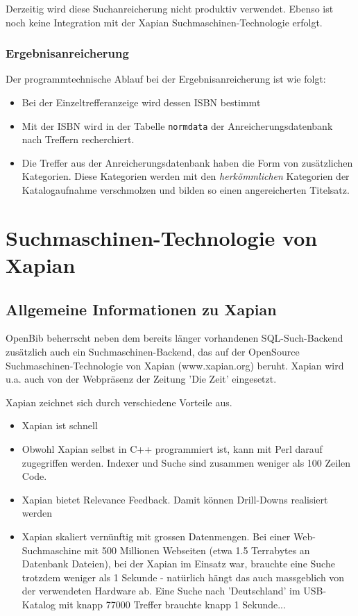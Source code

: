 \documentclass[11pt, twoside, a4paper, BCOR8mm, DIV12, bibtotoc,idxtotoc]{scrbook}
\begin{document}
Derzeitig wird diese Suchanreicherung nicht produktiv
verwendet. Ebenso ist noch keine Integration mit der Xapian
Suchmaschinen-Technologie erfolgt.

\subsubsection{Ergebnisanreicherung}
Der programmtechnische Ablauf bei der Ergebnisanreicherung ist wie folgt:

\begin{itemize}
\item Bei der Einzeltrefferanzeige wird dessen ISBN bestimmt
\item Mit der ISBN wird in der Tabelle \texttt{normdata} der
  Anreicherungs\-datenbank nach Treffern recherchiert.
\item Die Treffer aus der Anreicherungsdatenbank haben die Form von
  zusätzlichen Kategorien. Diese Kategorien werden mit den
  \emph{herkömmlichen} Kategorien der Katalogaufnahme ver\-schmol\-zen
  und bilden so einen angereicherten Titelsatz.
\end{itemize}

\section{Suchmaschinen-Technologie von Xapian}


\subsection{Allgemeine Informationen zu Xapian}

OpenBib beherrscht neben dem bereits länger vorhandenen SQL-Such-Backend
zusätzlich auch ein Suchmaschinen-Backend, das auf der OpenSource
Suchmaschinen-Technologie von Xapian (www.xapian.org) beruht. Xapian
wird u.a. auch von der Webpräsenz der Zeitung 'Die Zeit' eingesetzt.

Xapian zeichnet sich durch verschiedene Vorteile aus.

\begin{itemize}
\item Xapian ist schnell
\item Obwohl Xapian selbst in C++ programmiert ist, kann mit Perl darauf zugegriffen
werden. Indexer und Suche sind zusammen weniger als 100 Zeilen Code.
\item Xapian bietet Relevance Feedback. Damit können Drill-Downs realisiert
werden
\item Xapian skaliert vernünftig mit grossen Datenmengen. Bei einer
Web-Suchmaschine mit 500 Millionen Webseiten (etwa 1.5 Terrabytes an
Datenbank Dateien), bei der Xapian im Einsatz war, brauchte eine Suche
trotzdem weniger als 1 Sekunde - natürlich hängt das auch massgeblich von
der verwendeten Hardware ab. Eine Suche nach 'Deutschland' im USB-Katalog
mit knapp 77000 Treffer brauchte knapp 1 Sekunde...
\end{itemize}
\end{document}
